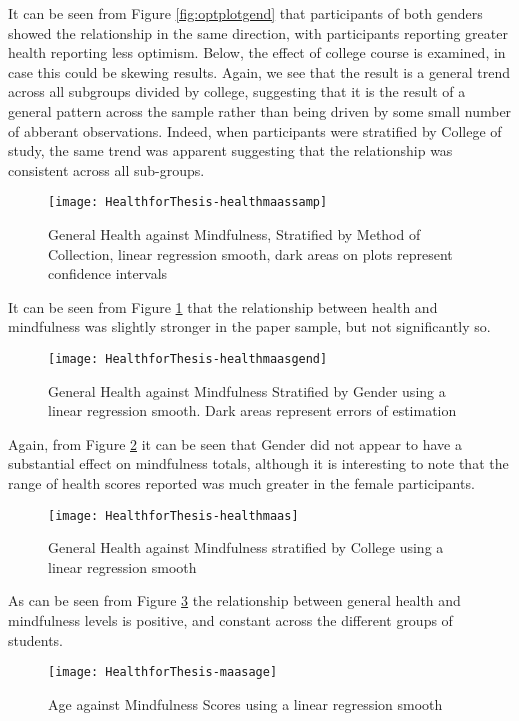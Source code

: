\documentclass{article}
\begin{document}
It can be seen from Figure \ref{fig:optplotgend} that participants of both genders showed the relationship in the same direction, with participants reporting greater health reporting less optimism.  Below, the effect of college course is examined, in case this could be skewing results. Again, we see that the result is a general trend across all subgroups divided by college, suggesting that it is the result of a general pattern across the sample rather than being driven by some small number of abberant observations. Indeed, when participants were stratified by College of study, the same trend was apparent suggesting that the relationship was consistent across all sub-groups. 



\begin{figure}
\texttt{[image: HealthforThesis-healthmaassamp]}
  \caption{General Health against Mindfulness, Stratified by Method of Collection, linear regression smooth, dark areas on plots represent confidence intervals}
  \label{fig:healthmaasmethplot}
\end{figure}


It can be seen from Figure \ref{fig:healthmaasmethplot} that the relationship between health and mindfulness was slightly stronger in the paper sample, but not significantly so.
\begin{figure}
\texttt{[image: HealthforThesis-healthmaasgend]}
  \caption{General Health against Mindfulness Stratified by Gender using a linear regression smooth. Dark areas represent errors of estimation}
  \label{fig:healthmaasgend}
\end{figure}


Again, from Figure \ref{fig:healthmaasgend} it can be seen that Gender did not appear to have a substantial effect on mindfulness totals, although it is interesting to note that the range of health scores reported was much greater in the female participants.
\begin{figure}
\texttt{[image: HealthforThesis-healthmaas]}
  \caption{General Health against Mindfulness stratified by College using a linear regression smooth}
  \label{fig:healthmaascoll}
\end{figure}


As can be seen from Figure \ref{fig:healthmaascoll} the relationship between general health and mindfulness levels is positive, and constant across the different groups of students.

\begin{figure}
\texttt{[image: HealthforThesis-maasage]}
  \caption{Age against Mindfulness Scores using a linear regression smooth}
  \label{fig:maasage}
\end{figure}
\end{document}
